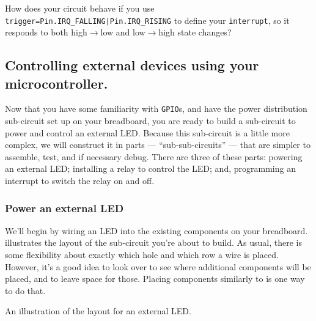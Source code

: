 \begin{enumerate}
	\smallskip
	How does your circuit behave if you use \lstinline{trigger=Pin.IRQ_FALLING|Pin.IRQ_RISING} to define your \texttt{interrupt}, so it responds to both high$\rightarrow$low and low$\rightarrow$high state changes?
\end{enumerate}



\subsection{Controlling external devices using your microcontroller.}
Now that you have some familiarity with \texttt{GPIO}s, and have the power distribution sub-circuit set up on your breadboard, you are ready to build a sub-circuit to power and control an external LED.
Because this sub-circuit is a little more complex, we will construct it in parts --- ``sub-sub-circuits'' --- that are simpler to assemble, test, and if necessary debug.
There are three of these parts: powering an external LED; installing a relay to control the LED; and, programming an interrupt to switch the relay on and off.
\subsubsection{\howto Power an external LED}
We'll begin by wiring an LED into the existing components on your breadboard.
 illustrates the layout of the sub-circuit you're about to build.
As usual, there is some flexibility about exactly which hole and which row a wire is placed.
However, it's a good idea to look over  to see where additional components will be placed, and to leave space for those.
Placing components similarly to  is one way to do that.
\begin{marginfigure}[-8cm]
	\begin{center}
		\caption[External LED layout]{An illustration of the layout for an external LED. }
	\end{center}
\end{marginfigure}


